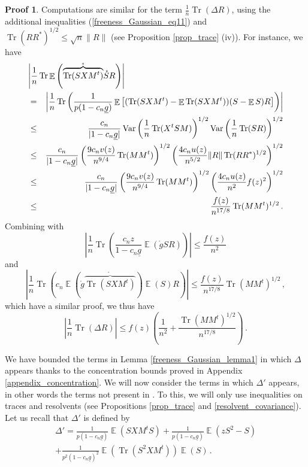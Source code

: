 \documentclass[11pt,a4paper]{article}
\DeclareMathOperator{\E}{\mathbb{E}}
\DeclareMathOperator{\1}{\mathbf{1}}
\DeclareMathOperator{\Var}{\mathrm{Var}}
\DeclareMathOperator{\Tr}{\mathrm{Tr}}
\newcommand{\gbar}{\underline{g}}
\theoremstyle{definition}
\newtheorem*{Proof}{Proof}
\begin{document}
\begin{Proof}
Computations are similar for the term $\frac1n \Tr(\Delta R)$, using the additional inequalities (\ref{freeness_Gaussian_eq11}) and $\Tr(RR^*)^{1/2} \le \sqrt{n} \|R\|$ (see Proposition \ref{prop_trace} (iv)). For instance, we have
\begin{eqnarray*}
\lefteqn{   \left| \frac1n \Tr \E \left( \mathring{\overbrace{\Tr(SXM^t)}} \mathring{S}R \right) \right|   } \\
& = & \left| \frac1n \Tr \left( \frac{1}{p(1-c_n\gbar)} \E \left[ (\Tr(SXM^t)-\E \Tr(SXM^t)) (S-\E S)R \right] \right) \right| \\
& \le & \frac{c_n}{|1-c_n\gbar|} \Var \left( \frac1n \Tr(X^tSM) \right)^{1/2} \Var \left( \frac1n \Tr(SR) \right)^{1/2} \\
& \le & \frac{c_n}{|1-c_n\gbar|} \left( \frac{9c_n v(z)}{n^{9/4}} \Tr(MM^t) \right)^{1/2} \left( \frac{4c_n u(z)}{n^{5/2}} \|R\| \Tr(RR^*)^{1/2} \right)^{1/2} \\
& \le & \frac{c_n}{|1-c_n\gbar|} \left( \frac{9c_n v(z)}{n^{9/4}} \Tr(MM^t) \right)^{1/2} \left( \frac{4c_n u(z)}{n^2} f(z)^2 \right)^{1/2} \\
& \le & \frac{f(z)}{n^{17/8}} \Tr(MM^t)^{1/2} \, .
\end{eqnarray*}
Combining with
\begin{displaymath}
\left| \frac1n \Tr \left( \frac{c_n z}{1-c_n\gbar} \E( \mathring{g}SR ) \right) \right| \le \frac{f(z)}{n^2}
\end{displaymath}
and
\begin{displaymath}
\left| \frac1n \Tr \left( c_n \E \left( \mathring{g} \mathring{\overbrace{\Tr(SXM^t)}} \right) \E(S)R \right) \right| \le \frac{f(z)}{n^{17/8}} \Tr(MM^t)^{1/2} \, ,
\end{displaymath}
which have a similar proof, we thus have
\begin{equation} \label{freeness_Gaussian_eq17}
\left| \frac1n \Tr(\Delta R) \right| \le f(z) \left( \frac{1}{n^2} + \frac{\Tr(MM^t)^{1/2}}{n^{17/8}} \right) \, .
\end{equation}

We have bounded the terms in Lemma \ref{freeness_Gaussian_lemma1} in which $\Delta$ appears thanks to the concentration bounds proved in Appendix \ref{appendix_concentration}. We will now consider the terms in which $\Delta'$ appears, in other words the terms not present in \cite{VLM}. To this, we will only use inequalities on traces and resolvents (see Propositions \ref{prop_trace} and \ref{resolvent_covariance}). Let us recall that $\Delta'$ is defined by
\begin{multline*}
\Delta' = \frac{1}{p(1-c_n\gbar)} \E(SXM^tS) + \frac{1}{p(1-c_n\gbar)} \E(zS^2-S) \\
+ \frac{1}{p^2(1-c_n\gbar)^2} \E(\Tr(S^2XM^t)) \E(S) \, .
\end{multline*}


\end{Proof}
\end{document}
